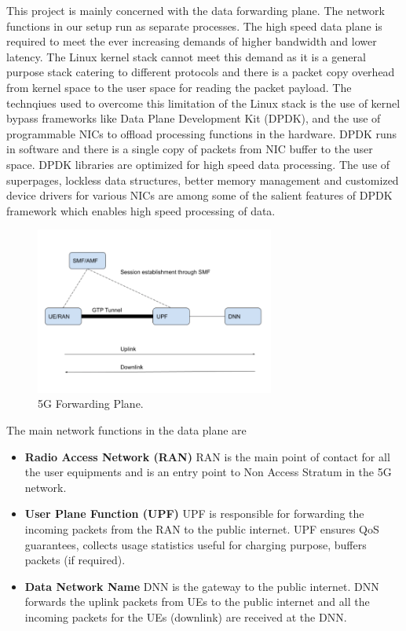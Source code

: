 This project is mainly concerned with the data forwarding plane. The network functions in our setup run as separate processes.
The high speed data plane is required to meet the ever increasing demands of higher bandwidth and lower latency. The Linux kernel stack cannot meet this demand as it is a general purpose stack catering to different protocols and there is a packet copy overhead from kernel space to the user space for reading the packet payload. The technqiues used to overcome this limitation of the Linux stack is the use of kernel bypass frameworks like Data Plane Development Kit (DPDK), and the use of programmable NICs to offload processing functions in the hardware. 
DPDK runs in software and there is a single copy of packets from NIC buffer to the
 user space. DPDK libraries are optimized for high speed data processing. The use
  of superpages, lockless data structures, better memory management and customized device drivers for
   various NICs are among some of the salient features of DPDK framework which
   enables high speed processing of data. 
\begin{figure}[htbp]
	\centering
       \includegraphics[width=0.7\textwidth]{fig/5Goverview.png}
       \setlength{\belowcaptionskip}{-12pt}
	\caption{5G Forwarding Plane.}
	\label{fig:5gForwardingPlane}
       \end{figure}



   The main network functions in the data plane are 
   \begin{itemize}
	   \item \textbf{Radio Access Network (RAN)} RAN is the main point of contact for all the user equipments and is an entry point to Non Access Stratum in the 5G network.
	   \item \textbf{User Plane Function (UPF)}
	   UPF is responsible for forwarding the incoming packets from the RAN to the public internet. UPF ensures QoS guarantees, collects usage statistics useful for charging purpose, buffers packets (if required).
	   
	   \item \textbf{Data Network Name}
	   DNN is the gateway to the public internet. DNN forwards the uplink packets from UEs to the public internet and all the incoming packets for the UEs (downlink) are received at the DNN.
   \end{itemize}
  
